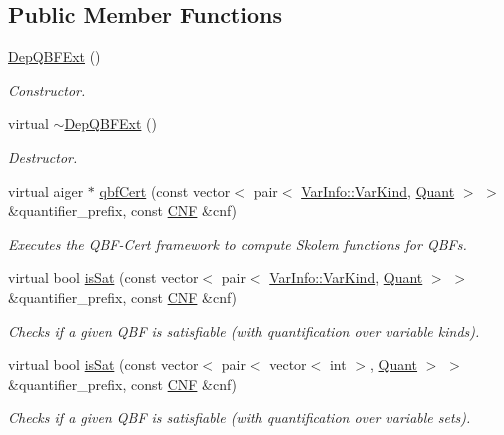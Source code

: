 \subsection*{Public Member Functions}
\begin{DoxyCompactItemize}
\item 
\hyperlink{classDepQBFExt_a4544322ebc125d28e583106baf2c71cb}{Dep\-Q\-B\-F\-Ext} ()
\begin{DoxyCompactList}\small\item\em Constructor. \end{DoxyCompactList}\item 
virtual \hyperlink{classDepQBFExt_a6425c670e11fb6f2315171e27f850954}{$\sim$\-Dep\-Q\-B\-F\-Ext} ()
\begin{DoxyCompactList}\small\item\em Destructor. \end{DoxyCompactList}\item 
virtual aiger $\ast$ \hyperlink{classDepQBFExt_a9de37d00363d5ad71eaf03c011314b31}{qbf\-Cert} (const vector$<$ pair$<$ \hyperlink{classVarInfo_a64d1da76cf84fe674e5fef9764ef11cf}{Var\-Info\-::\-Var\-Kind}, \hyperlink{classQBFSolver_ac091e263cb55286cc07b2451bcf4d3c7}{Quant} $>$ $>$ \&quantifier\-\_\-prefix, const \hyperlink{classCNF}{C\-N\-F} \&cnf)
\begin{DoxyCompactList}\small\item\em Executes the Q\-B\-F-\/\-Cert framework to compute Skolem functions for Q\-B\-Fs. \end{DoxyCompactList}\item 
virtual bool \hyperlink{classExtQBFSolver_abec25b97170b79b42b85d1d4ec825a39}{is\-Sat} (const vector$<$ pair$<$ \hyperlink{classVarInfo_a64d1da76cf84fe674e5fef9764ef11cf}{Var\-Info\-::\-Var\-Kind}, \hyperlink{classQBFSolver_ac091e263cb55286cc07b2451bcf4d3c7}{Quant} $>$ $>$ \&quantifier\-\_\-prefix, const \hyperlink{classCNF}{C\-N\-F} \&cnf)
\begin{DoxyCompactList}\small\item\em Checks if a given Q\-B\-F is satisfiable (with quantification over variable kinds). \end{DoxyCompactList}\item 
virtual bool \hyperlink{classExtQBFSolver_adc1bacec3307200dd90b260789e4c808}{is\-Sat} (const vector$<$ pair$<$ vector$<$ int $>$, \hyperlink{classQBFSolver_ac091e263cb55286cc07b2451bcf4d3c7}{Quant} $>$ $>$ \&quantifier\-\_\-prefix, const \hyperlink{classCNF}{C\-N\-F} \&cnf)
\begin{DoxyCompactList}\small\item\em Checks if a given Q\-B\-F is satisfiable (with quantification over variable sets). \end{DoxyCompactList}\item 

\end{DoxyCompactItemize}
